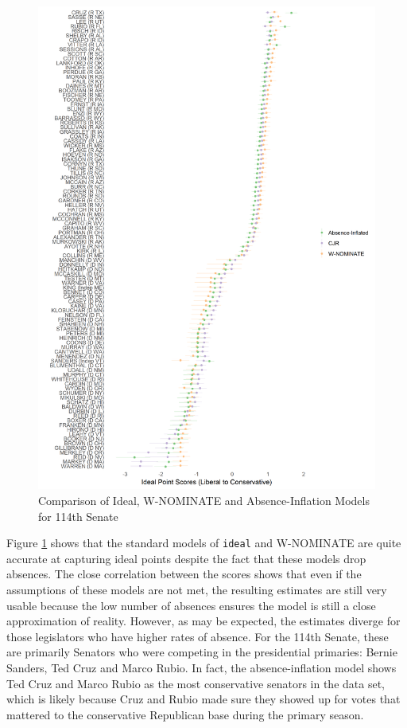 	\begin{figure}
		\centering
		\caption{Comparison of Ideal, W-NOMINATE and Absence-Inflation Models for 114th Senate}\label{compare_con}
			\includegraphics[width=\linewidth]{all_perf}
	\end{figure}
	
	Figure \ref{compare_con} shows that the standard models of \texttt{ideal} and W-NOMINATE are quite accurate at capturing ideal points despite the fact that these models drop absences. The close correlation between the scores shows that even if the assumptions of these models are not met, the resulting estimates are still very usable because the low number of absences ensures the model is still a close approximation of reality. However, as may be expected, the estimates diverge for those legislators who have higher rates of absence. For the 114th Senate, these are primarily Senators who were competing in the presidential primaries: Bernie Sanders, Ted Cruz and Marco Rubio. In fact, the absence-inflation model shows Ted Cruz and Marco Rubio as the most conservative senators in the data set, which is likely because Cruz and Rubio made sure they showed up for votes that mattered to the conservative Republican base during the primary season.
	
